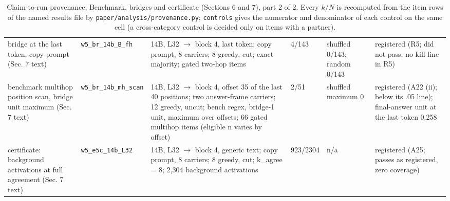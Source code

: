 \begin{table}[t]
\begin{tabular}{@{}p{2.5cm}p{2.3cm}p{4.5cm}p{1.3cm}p{3.0cm}p{2.9cm}@{}}
bridge at the last token, copy prompt (Sec. 7 text) & \texttt{w5\_\allowbreak{{}}br\_\allowbreak{{}}14b\_\allowbreak{{}}B\_\allowbreak{{}}fh} & 14B, L32 $\to$ block 4, last token; copy prompt, 8 carriers; 8 greedy, cut; exact majority; gated two-hop items & 4/143 & shuffled 0/143; random 0/143 & registered (R5; did not pass; no kill line in R5) \\
benchmark multihop position scan, bridge unit maximum (Sec. 7 text) & \texttt{w5\_\allowbreak{{}}br\_\allowbreak{{}}14b\_\allowbreak{{}}mh\_\allowbreak{{}}scan} & 14B, L32 $\to$ block 4, offset 35 of the last 40 positions; two answer-frame carriers; 12 greedy, uncut; bench regex, bridge-1 unit, maximum over offsets; 66 gated multihop items (eligible n varies by offset) & 2/51 & shuffled maximum 0 & registered (A22 (ii); below its .05 line); final-answer unit at the last token 0.258 \\
certificate: background activations at full agreement (Sec. 7 text) & \texttt{w5\_\allowbreak{{}}e5c\_\allowbreak{{}}14b\_\allowbreak{{}}L32} & 14B, L32 $\to$ block 4, generic text; copy prompt, 8 carriers; 8 greedy, cut; k\_agree = 8; 2,304 background activations & 923/2304 & n/a & registered (A25; passes as registered, zero coverage) \\
\bottomrule
\end{tabular}
\caption{Claim-to-run provenance, Benchmark, bridges and certificate (Sections 6 and 7), part 2 of 2. Every $k/N$ is recomputed from the item rows of the named results file by \texttt{paper/analysis/provenance.py}; \texttt{controls} gives the numerator and denominator of each control on the same cell (a cross-category control is decided only on items with a partner).}
\end{table}
